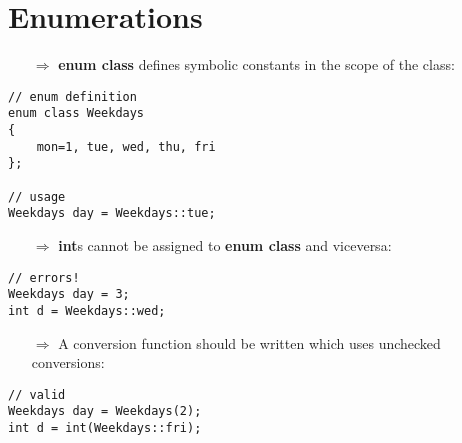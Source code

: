 \documentclass[10pt]{article}
\begin{document}
\section{Enumerations}
\small
\begin{enumerate}
\item[$\Rightarrow$] \textbf{enum class} defines symbolic constants in the scope of the class:
\end{enumerate}
\begin{lstlisting}
// enum definition
enum class Weekdays
{
    mon=1, tue, wed, thu, fri
};

// usage
Weekdays day = Weekdays::tue;
\end{lstlisting}
\begin{enumerate}
\item[$\Rightarrow$] \textbf{int}s cannot be assigned to \textbf{enum class} and viceversa:
\end{enumerate}
\begin{lstlisting}
// errors!
Weekdays day = 3;
int d = Weekdays::wed;
\end{lstlisting}
\begin{enumerate}
\item[$\Rightarrow$] A conversion function should be written which uses unchecked conversions:
\end{enumerate}
\begin{lstlisting}
// valid
Weekdays day = Weekdays(2);
int d = int(Weekdays::fri);
\end{lstlisting}
%
%
\end{document}
